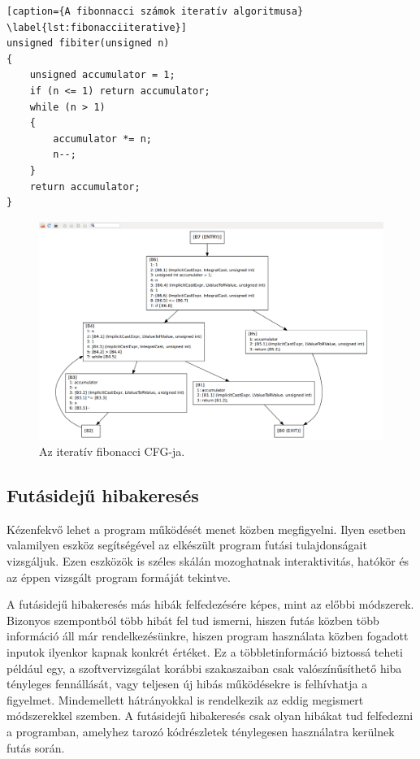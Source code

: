 \documentclass[a4paper,12pt]{report}
\begin{document}
\begin{minipage}{\linewidth}
\begin{lstlisting}[caption={A fibonnacci számok iteratív algoritmusa}
\label{lst:fibonacciiterative}]
unsigned fibiter(unsigned n)
{
    unsigned accumulator = 1;
    if (n <= 1) return accumulator;
    while (n > 1)
    {
        accumulator *= n;
        n--;
    }
    return accumulator;
}
\end{lstlisting}
\end{minipage}

\begin{figure}[h]
\caption{Az iteratív fibonacci CFG-ja.}
\centering
\includegraphics[scale=0.2]{fibiter_cfg.png}
\end{figure}

\subsection{Futásidejű hibakeresés}
Kézenfekvő lehet a program működését menet közben megfigyelni. Ilyen esetben valamilyen eszköz segítségével az elkészült program futási tulajdonságait vizsgáljuk. Ezen eszközök is széles skálán mozoghatnak interaktivitás, hatókör és az éppen vizsgált program formáját tekintve.

A futásidejű hibakeresés más hibák felfedezésére képes, mint az előbbi módszerek. Bizonyos szempontból több hibát fel tud ismerni, hiszen futás közben több információ áll már rendelkezésünkre, hiszen program használata közben fogadott inputok ilyenkor kapnak konkrét értéket. Ez a többletinformáció biztossá teheti például egy, a szoftvervizsgálat korábbi szakaszaiban csak valószínűsíthető hiba tényleges fennállását, vagy teljesen új hibás működésekre is felhívhatja a figyelmet. Mindemellett hátrányokkal is rendelkezik az eddig megismert módszerekkel szemben. A futásidejű hibakeresés csak olyan hibákat tud felfedezni a programban, amelyhez tarozó kódrészletek ténylegesen használatra kerülnek futás során.
\end{document}
